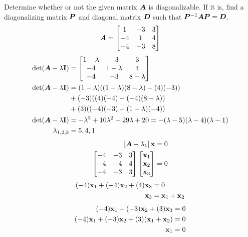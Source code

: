 \documentclass{article}
\begin{document}
Determine whether or not the given matrix $ \bm{A} $ is diagonalizable. If it is, find a diagonalizing matrix $ \bm{P} $ and diagonal matrix $ \bm{D} $ such that $ \bm{P}^{-1}\bm{A}\bm{P} = \bm{D} $.
\begin{equation*}
	\bm{A} =
		\begin{bmatrix}
			1 & -3 & 3 \\
			-4 & 1 & 4 \\
			-4 & -3 & 8
		\end{bmatrix}
\end{equation*}
\begin{align*}
	\det( \matr{A} - \lambda \vect{I} ) & =
		\begin{bmatrix}
			1 - \lambda & -3 & 3 \\
			-4 & 1 - \lambda & 4 \\
			-4 & -3 & 8 - \lambda
		\end{bmatrix} \\
	\det( \matr{A} - \lambda \vect{I} )
		& = (1 - \lambda)( (1 - \lambda)(8 - \lambda) - (4)(-3) )  \\
		& + (-3)( (4)(-4) - (-4)(8 - \lambda) ) \\
		& + (3)( (-4)(-3) - (1 - \lambda)(-4) ) \\
	\det( \matr{A} - \lambda \vect{I} ) & =
		-\lambda^3 + 10\lambda^2 - 29\lambda + 20 = -(\lambda - 5)(\lambda - 4)(\lambda - 1) \\
	\lambda_{1,2,3} & = 5, 4, 1
\end{align*}
\begin{align*}
	\left[ \matr{A} - \lambda_1 \right] \vect{x} & = 0 \\
	\begin{bmatrix}
		-4 & -3 & 3 \\
		-4 & -4 & 4 \\
		-4 & -3 & 3
	\end{bmatrix}
	\begin{bmatrix} \vect{x}_1 \\ \vect{x}_2 \\ \vect{x}_3 \end{bmatrix} & = 0
\end{align*}
\begin{align*}
	(-4)\vect{x}_1 + (-4)\vect{x}_2 + (4)\vect{x}_3 & = 0 \\
	\vect{x}_3 & = \vect{x}_1 + \vect{x}_2
\end{align*}
\begin{align*}
	(-4)\vect{x}_1 + (-3)\vect{x}_2 + (3)\vect{x}_3 & = 0 \\
	(-4)\vect{x}_1 + (-3)\vect{x}_2 + (3)(\vect{x}_1 + \vect{x}_2) & = 0 \\
	\vect{x}_1 & = 0
\end{align*}
\end{document}
